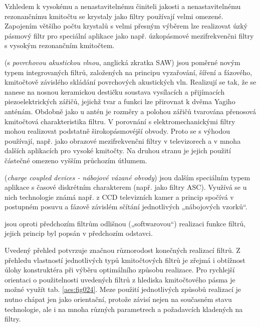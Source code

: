 \begin{description}[noitemsep, font=\small]
              Vzhledem k vysokému a nenastavitelnému činiteli jakosti a nenastavitelnému
              rezonančnímu kmitočtu se krystaly jako filtry používají velmi omezené. Zapojením
              většího počtu krystalů s velmi přesným výběrem lze realizovat úzký pásmový filtr pro
              speciální aplikace jako např. úzkopásmové mezifrekvenčni filtry s vysokým
              rezonančním kmitočtem.
        \item[\textbf{Filtry s PAV}] (s \emph{povrchovou akustickou vlnou}, anglická zkratka SAW)
              jsou poměrné novým typem integrovaných filtrů, založených na principu vyzařování,
              šíření a fázového, kmitočtově závislého skládání povrchových akustických vln.
              Realizují se tak, že se nanese na nosnou keramickou destičku soustava vysílacích a
              přijímacích piezoelektrických zářičů, jejichž tvar a funkci lze přirovnat k dvěma
              Yagiho anténám. Obdobně jako u antén je rozměry a polohou zářičů tvarována přenosová
              kmitočtová charakteristika filtru. V porovnání s elektromechanickými filtry mohou
              realizovat podstatně širokopásmovéjší obvody. Proto se s výhodou používají, např.
              jako obrazové mezifrekvenčni filtry v televizorech a v mnoha dalších aplikacích pro
              vysoké kmitočty. Na druhou stranu je jejich použití částečné omezeno vyšším
              průchozím útlumem.
        \item[\textbf{Filtry CCD}] (\emph{charge coupled devices - nábojové vázané obvody}) jsou
              dalším speciálním typem aplikace s časové diskrétním charakterem (např. jako filtry
              ASC). Využívá se u nich technologie známá např. z CCD televizních kamer a princip
              spočívá v postupném posuvu a fázově závislém sčítání jednotlivých „nábojových
              vzorků“.
        \item[\textbf{Číslicové filtry}] jsou oproti předchozím filtrům odlišnou („softwarovou“)
              realizaci funkce filtrů, jejich princip byl popsán v předchozím odstavci.
      \end{description}
      Uvedený přehled potvrzuje značnou různorodost konečných realizací filtrů. Z přehledu
      vlastností jednotlivých typů kmitočtových filtrů je zřejmá i obtížnost úlohy konstruktéra
      při výběru optimálního způsobu realizace. Pro rychlejší orientaci o použitelnosti
      uvedených filtrů z hlediska kmitočtového pásma je možné využít tab.
      \ref{aes:fig024}. Meze použití jednotlivých způsobů realizací je nutno chápat
      jen jako orientační, protože závisí nejen na současném stavu technologie, ale i na mnoha
      různých parametrech a požadavcích kladených na filtry.

